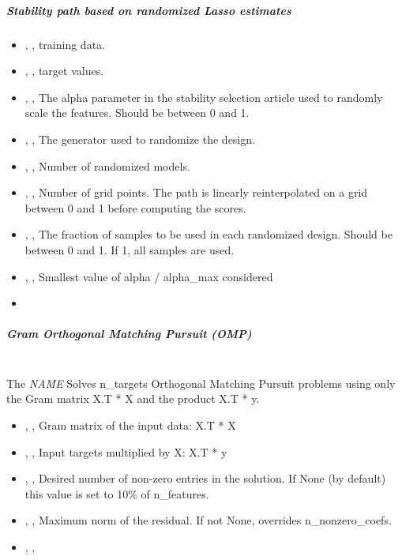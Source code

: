\subparagraph{Stability path based on randomized Lasso estimates}
\mbox{}
\begin{itemize}
  \item {}, ,
  training data.
  \item {}, ,
  target values.
  \item {}, ,
  The alpha parameter in the stability selection article used to randomly scale
  the features.
  Should be between 0 and 1.
  \item {}, ,
  The generator used to randomize the design.
  \item {}, ,
  Number of randomized models.
  \item {}, ,
  Number of grid points.
  The path is linearly reinterpolated on a grid between 0 and 1 before computing
  the scores.
  \item {}, ,
  The fraction of samples to be used in each randomized design.
  Should be between 0 and 1.
  If 1, all samples are used.
  \item {}, ,
  Smallest value of alpha / alpha\_max considered
  \item \verDescriptionB
\end{itemize}

\subparagraph{Gram Orthogonal Matching Pursuit (OMP)}
\mbox{}
\\The \textit{NAME} Solves n\_targets Orthogonal Matching Pursuit
problems using only the Gram matrix X.T * X and the product X.T * y.
%
\begin{itemize}
  \item {}, ,
  Gram matrix of the input data: X.T * X
  \item {}, ,
  Input targets multiplied by X: X.T * y
  \item {}, ,
  Desired number of non-zero entries in the solution.
  If None (by default) this value is set to 10\% of n\_features.
  \item {}, ,
  Maximum norm of the residual.
  If not None, overrides n\_nonzero\_coefs.
  \item {}, ,
\end{itemize}

